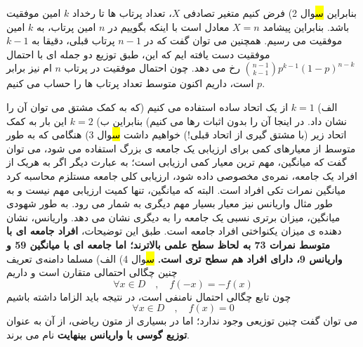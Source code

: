 \documentclass[10pt,letterpaper]{article}
\begin{document}
بنابراین
\hl
سوال 2) فرض کنیم متغیر تصادفی $X$، تعداد پرتاب ها تا رخداد $k$ امین موفقیت  باشد. بنابراین پیشامد $X=n$ معادل است با اینکه بگوییم در $n$ امین پرتاب، به $k$ امین موفقیت می رسیم. همچنین می توان گفت که در $n-1$ پرتاب قبلی، دقیقا به $k-1$ موفقیت دست یافته ایم که این، طبق توزیع دو جمله ای با احتمال 
$
\binom{n-1}{k-1}p^{k-1}(1-p)^{n-k}
$
 رخ می دهد. چون احتمال موفقیت در پرتاب $n$ ام نیز برابر $p$ است، داریم
اکنون متوسط تعداد پرتاب ها را حساب می کنیم.

الف) $k=1$
از یک اتحاد ساده استفاده می کنیم (که به کمک مشتق می توان آن را نشان داد. در اینجا آن را بدون اثبات رها می کنیم)
بنابراین
ب) $k=2$
این بار به کمک اتحاد زیر (با مشتق گیری از اتحاد قبلی!)
خواهیم داشت
\hl
سوال 3) هنگامی که به طور متوسط از معیارهای کمی برای ارزیابی یک جامعه ی بزرگ استفاده می شود، می توان گفت که میانگین، مهم ترین معیار کمی ارزیابی است؛ به عبارت دیگر اگر به هریک از افراد یک جامعه، نمره‌ی مخصوصی داده شود، ارزیابی کلی جامعه مستلزم محاسبه کرد میانگین نمرات تکی افراد است. البته که میانگین، تنها کمیت ارزیابی مهم نیست و به طور مثال واریانس نیز معیار بسیار مهم دیگری به شمار می رود. به طور شهودی میانگین، میزان برتری نسبی یک جامعه را به دیگری نشان می دهد. واریانس، نشان دهنده ی میزان یکنواختی افراد جامعه است. طبق این توضیحات، 
\textbf{
افراد جامعه ای با متوسط نمرات 73 به لحاظ سطح علمی بالاترند؛ اما جامعه ای با میانگین 59 و واریانس 9، دارای افراد هم سطح تری است.
}
\hl
سوال 4) الف) مسلما دامنه‌ی تعریف چنین چگالی احتمالی متقارن است و داریم
$$
\forall x\in D\quad,\quad f(-x)=-f(x)
$$
چون تابع چگالی احتمال نامنفی است، در نتیجه باید الزاما داشته باشیم
$$
\forall x\in D\quad,\quad f(x)=0
$$
می توان گفت چنین توزیعی وجود ندارد؛ اما در بسیاری از متون ریاضی، از آن به عنوان 
\textbf{
توزیع گوسی با واریانس بینهایت
}
 نام می برند.
\end{document}
